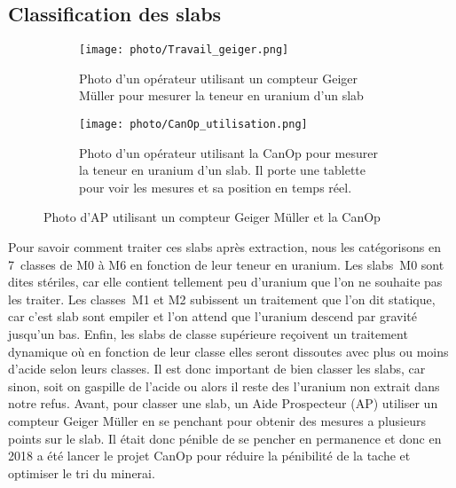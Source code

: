 \subsection{Classification des slabs}
\label{ssec_classification}
\begin{figure}

    \begin{subfigure}[t]{0.4\textwidth}
        \centering
        \texttt{[image: photo/Travail\_geiger.png]}
        \caption{Photo d'un opérateur utilisant un compteur Geiger Müller pour mesurer la teneur en uranium d'un slab}
        \label{fig_AP_geiger}
    \end{subfigure}
    \begin{subfigure}[t]{0.6\textwidth}
        \centering
        \texttt{[image: photo/CanOp\_utilisation.png]}
        \caption{Photo d'un opérateur utilisant la CanOp pour mesurer la teneur en uranium d'un slab. Il porte une tablette pour voir les mesures et sa position en temps réel.}
        \label{fig_AP_CanOp}
    \end{subfigure}
    \caption{Photo d'AP utilisant un compteur Geiger Müller et la CanOp}
\end{figure}
Pour savoir comment traiter ces slabs  après extraction, nous les catégorisons en 7~classes de M0 à M6 en fonction de leur teneur en uranium. Les slabs~M0 sont dites stériles, car elle contient tellement peu d'uranium que l'on ne souhaite pas les traiter. Les classes~M1 et M2 subissent un traitement que l'on dit statique, car c'est slab sont empiler et l’on attend que l'uranium descend par gravité jusqu'un bas. Enfin, les slabs de classe supérieure reçoivent un traitement dynamique où en fonction de leur classe elles seront dissoutes avec plus ou moins d'acide selon leurs classes. Il est donc important de bien classer les slabs, car sinon, soit on gaspille  de l'acide ou alors il reste des l'uranium non extrait dans notre refus.
Avant, pour classer une slab, un Aide Prospecteur (AP) utiliser un compteur Geiger Müller en se penchant pour obtenir des mesures a plusieurs points sur le slab. Il était donc pénible de se pencher en permanence et donc en 2018 a été lancer le projet CanOp pour réduire la pénibilité de la tache et optimiser le tri du minerai.
